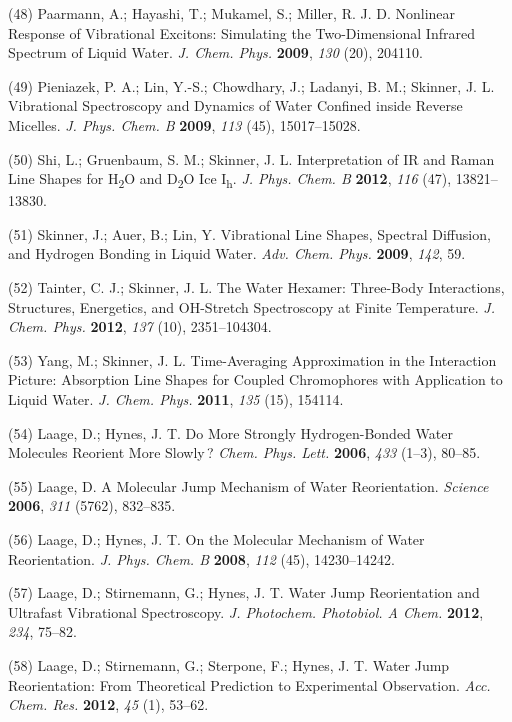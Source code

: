 \documentclass[]{article}
\begin{document}
(48) Paarmann, A.; Hayashi, T.; Mukamel, S.; Miller, R. J. D. Nonlinear
Response of Vibrational Excitons: Simulating the Two-Dimensional
Infrared Spectrum of Liquid Water. \emph{J. Chem. Phys.} \textbf{2009},
\emph{130} (20), 204110.

(49) Pieniazek, P. A.; Lin, Y.-S.; Chowdhary, J.; Ladanyi, B. M.;
Skinner, J. L. Vibrational Spectroscopy and Dynamics of Water Confined
inside Reverse Micelles. \emph{J. Phys. Chem. B} \textbf{2009},
\emph{113} (45), 15017--15028.

(50) Shi, L.; Gruenbaum, S. M.; Skinner, J. L. Interpretation of IR and
Raman Line Shapes for H\textsubscript{2}O and D\textsubscript{2}O Ice
I\textsubscript{h}. \emph{J. Phys. Chem. B} \textbf{2012}, \emph{116}
(47), 13821--13830.

(51) Skinner, J.; Auer, B.; Lin, Y. Vibrational Line Shapes, Spectral
Diffusion, and Hydrogen Bonding in Liquid Water. \emph{Adv. Chem. Phys.}
\textbf{2009}, \emph{142}, 59.

(52) Tainter, C. J.; Skinner, J. L. The Water Hexamer: Three-Body
Interactions, Structures, Energetics, and OH-Stretch Spectroscopy at
Finite Temperature. \emph{J. Chem. Phys.} \textbf{2012}, \emph{137}
(10), 2351--104304.

(53) Yang, M.; Skinner, J. L. Time-Averaging Approximation in the
Interaction Picture: Absorption Line Shapes for Coupled Chromophores
with Application to Liquid Water. \emph{J. Chem. Phys.} \textbf{2011},
\emph{135} (15), 154114.

(54) Laage, D.; Hynes, J. T. Do More Strongly Hydrogen-Bonded Water
Molecules Reorient More Slowly\,? \emph{Chem. Phys. Lett.}
\textbf{2006}, \emph{433} (1--3), 80--85.

(55) Laage, D. A Molecular Jump Mechanism of Water Reorientation.
\emph{Science} \textbf{2006}, \emph{311} (5762), 832--835.

(56) Laage, D.; Hynes, J. T. On the Molecular Mechanism of Water
Reorientation. \emph{J. Phys. Chem. B} \textbf{2008}, \emph{112} (45),
14230--14242.

(57) Laage, D.; Stirnemann, G.; Hynes, J. T. Water Jump Reorientation
and Ultrafast Vibrational Spectroscopy. \emph{J. Photochem. Photobiol. A
Chem.} \textbf{2012}, \emph{234}, 75--82.

(58) Laage, D.; Stirnemann, G.; Sterpone, F.; Hynes, J. T. Water Jump
Reorientation: From Theoretical Prediction to Experimental Observation.
\emph{Acc. Chem. Res.} \textbf{2012}, \emph{45} (1), 53--62.
\end{document}
